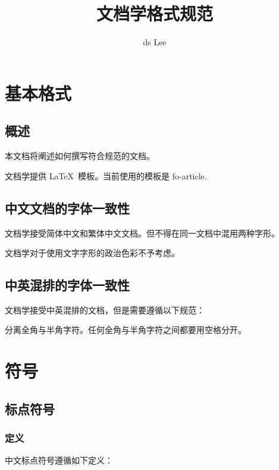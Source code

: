 \documentclass{fo-article}
\begin{document}
\author{ds Lee}
\title{文档学格式规范}
\maketitle

\chapter{基本格式}
\section{概述}

本文档将阐述如何撰写符合规范的文档。

文档学提供 \LaTeX\ 模板。当前使用的模板是 fo-article.

\section{中文文档的字体一致性}

文档学接受简体中文和繁体中文文档。但不得在同一文档中混用两种字形。

文档学对于使用文字字形的政治色彩不予考虑。

\section{中英混排的字体一致性}

文档学接受中英混排的文档，但是需要遵循以下规范：

\li
\item 分离全角与半角字符。任何全角与半角字符之间都要用空格分开。
\lix

\chapter{符号}
\section{标点符号}

\subsection{定义}

中文标点符号遵循如下定义：
\end{document}
